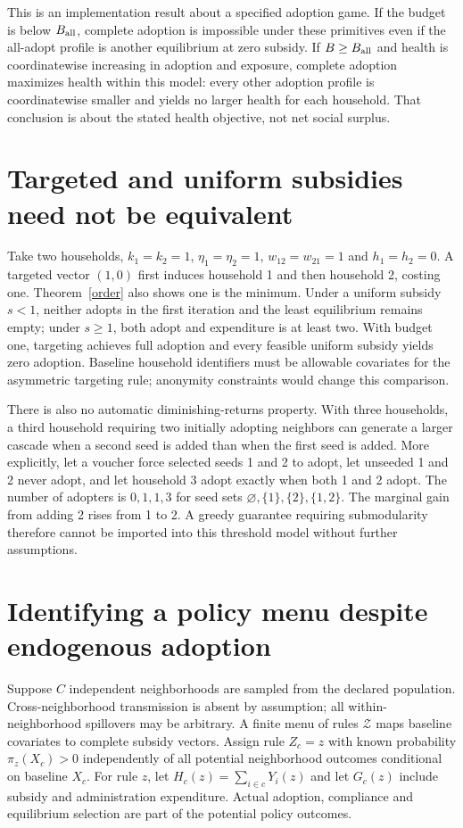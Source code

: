 \documentclass[11pt]{article}
\begin{document}
This is an implementation result about a specified adoption game. If the
budget is below $B_{\rm all}$, complete adoption is impossible under these
primitives even if the all-adopt profile is another equilibrium at zero
subsidy. If $B\geq B_{\rm all}$ and health is coordinatewise increasing
in adoption and exposure, complete adoption maximizes health within this
model: every other adoption profile is coordinatewise smaller and yields
no larger health for each household. That conclusion is about the stated
health objective, not net social surplus.

\section{Targeted and uniform subsidies need not be equivalent}
Take two households, $k_1=k_2=1$, $\eta_1=\eta_2=1$,
$w_{12}=w_{21}=1$ and $h_1=h_2=0$. A targeted vector $(1,0)$ first
induces household 1 and then household 2, costing one. Theorem~\ref{order}
also shows one is the minimum. Under a uniform subsidy $s<1$, neither
adopts in the first iteration and the least equilibrium remains empty;
under $s\geq1$, both adopt and expenditure is at least two. With budget
one, targeting achieves full adoption and every feasible uniform subsidy
yields zero adoption. Baseline household identifiers must be allowable
covariates for the asymmetric targeting rule; anonymity constraints would
change this comparison.

There is also no automatic diminishing-returns property. With three
households, a third household requiring two initially adopting neighbors
can generate a larger cascade when a second seed is added than when the
first seed is added. More explicitly, let a voucher force selected seeds
1 and 2 to adopt, let unseeded 1 and 2 never adopt, and let household 3
adopt exactly when both 1 and 2 adopt. The number of adopters is
$0,1,1,3$ for seed sets $\varnothing,\{1\},\{2\},\{1,2\}$.
The marginal gain from adding 2 rises from 1 to 2. A greedy guarantee
requiring submodularity therefore cannot be imported into this threshold
model without further assumptions.

\section{Identifying a policy menu despite endogenous adoption}
Suppose $C$ independent neighborhoods are sampled from the declared
population. Cross-neighborhood transmission is absent by assumption; all
within-neighborhood spillovers may be arbitrary. A finite menu of rules
$\mathcal Z$ maps baseline covariates to complete subsidy vectors.
Assign rule $Z_c=z$ with known probability $\pi_z(X_c)>0$ independently
of all potential neighborhood outcomes conditional on baseline $X_c$.
For rule $z$, let $H_c(z)=\sum_{i\in c}Y_i(z)$ and let $G_c(z)$ include
subsidy and administration expenditure. Actual adoption, compliance and
equilibrium selection are part of the potential policy outcomes.
\end{document}
